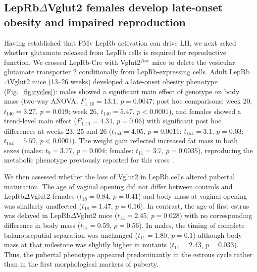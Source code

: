 \documentclass[11pt]{article}
\begin{document}
\subsection{LepRb$\Delta$Vglut2 females develop late-onset obesity and impaired reproduction}
Having established that PMv LepRb activation can drive LH, we next asked whether glutamate released from LepRb cells is required for reproductive function. We crossed LepRb-Cre with Vglut2$^{flox}$ mice to delete the vesicular glutamate transporter 2 conditionally from LepRb-expressing cells. Adult LepRb$\Delta$Vglut2 mice (13--26 weeks) developed a late-onset obesity phenotype (Fig.~\ref{fig:cycles}): males showed a significant main effect of genotype on body mass (two-way ANOVA, $F_{1,10}=13.1$, $p=0.0047$; post hoc comparisons: week 20, $t_{140}=3.27$, $p=0.019$; week 26, $t_{140}=5.47$, $p<0.0001$), and females showed a trend-level main effect ($F_{1,11}=4.34$, $p=0.06$) with significant post hoc differences at weeks 23, 25 and 26 ($t_{154}=4.05$, $p=0.0011$; $t_{154}=3.1$, $p=0.03$; $t_{154}=5.59$, $p<0.0001$). The weight gain reflected increased fat mass in both sexes (males: $t_{9}=3.77$, $p=0.004$; females: $t_{11}=3.7$, $p=0.0035$), reproducing the metabolic phenotype previously reported for this cross~\citep{martin2014leptinresponsive}.

We then assessed whether the loss of Vglut2 in LepRb cells altered pubertal maturation. The age of vaginal opening did not differ between controls and LepRb$\Delta$Vglut2 females ($t_{18}=0.84$, $p=0.41$) and body mass at vaginal opening was similarly unaffected ($t_{18}=1.47$, $p=0.16$). In contrast, the age of first estrus was delayed in LepRb$\Delta$Vglut2 mice ($t_{14}=2.45$, $p=0.028$) with no corresponding difference in body mass ($t_{14}=0.59$, $p=0.56$). In males, the timing of complete balanopreputial separation was unchanged ($t_{11}=1.80$, $p=0.1$) although body mass at that milestone was slightly higher in mutants ($t_{11}=2.43$, $p=0.033$). Thus, the pubertal phenotype appeared predominantly in the estrous cycle rather than in the first morphological markers of puberty.
\end{document}
